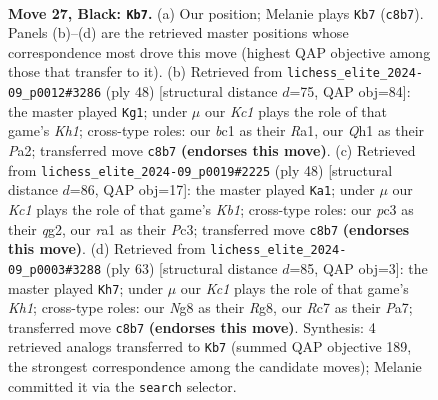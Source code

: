 \documentclass[11pt]{article}
\begin{document}
\clearpage

\begin{figure}[p]\centering
\begin{subfigure}{0.46\textwidth}\centering
\resizebox{\linewidth}{!}{%
\newchessgame
\chessboard[
  setfen={2k1Q1nr/2r3p1/8/2p3Pp/5P1P/2P5/PP3K2/RNB4q b - - 4 27},
  showmover=false,
  pgfstyle=straightmove, color=movearrow, markmove={c8-b7}
]}
\caption{}
\end{subfigure}\hfill
\begin{subfigure}{0.46\textwidth}\centering
\resizebox{\linewidth}{!}{%
\newchessgame
\chessboard[
  setfen={r3k3/p4p1p/4p2Q/2ppP3/8/2P2q2/PP3P1P/R4R1K w q - 7 25},
  showmover=false,
  pgfstyle=straightmove, color=movearrow, markmove={h1-g1}
]}
\caption{}
\end{subfigure}
\\[4pt]
\begin{subfigure}{0.46\textwidth}\centering
\resizebox{\linewidth}{!}{%
\newchessgame
\chessboard[
  setfen={r1bQ4/p4ppk/1p2p2p/4N3/5P2/2P5/PP4qP/1K2R3 w - - 2 25},
  showmover=false,
  pgfstyle=straightmove, color=movearrow, markmove={b1-a1}
]}
\caption{}
\end{subfigure}\hfill
\begin{subfigure}{0.46\textwidth}\centering
\resizebox{\linewidth}{!}{%
\newchessgame
\chessboard[
  setfen={3r2rk/pb4p1/1p2Q2p/8/2P4P/2B2P2/PP4P1/R5K1 b - - 0 32},
  showmover=false,
  pgfstyle=straightmove, color=movearrow, markmove={h8-h7}
]}
\caption{}
\end{subfigure}
\caption{\textbf{Move 27, Black: \texttt{Kb7}.} (a) Our position; Melanie plays \texttt{Kb7} (\texttt{c8b7}). Panels (b)--(d) are the retrieved master positions whose correspondence most drove this move (highest QAP objective among those that transfer to it). (b) Retrieved from \texttt{lichess\_elite\_2024-09\_p0012\#3286} (ply 48) [structural distance $d$=75, QAP obj=84]: the master played \texttt{Kg1}; under $\mu$ our \emph{Kc1} plays the role of that game's \emph{Kh1}; cross-type roles: our \emph{b}c1 as their \emph{R}a1, our \emph{Q}h1 as their \emph{P}a2; transferred move \texttt{c8b7} \textbf{(endorses this move)}. (c) Retrieved from \texttt{lichess\_elite\_2024-09\_p0019\#2225} (ply 48) [structural distance $d$=86, QAP obj=17]: the master played \texttt{Ka1}; under $\mu$ our \emph{Kc1} plays the role of that game's \emph{Kb1}; cross-type roles: our \emph{p}c3 as their \emph{q}g2, our \emph{r}a1 as their \emph{P}c3; transferred move \texttt{c8b7} \textbf{(endorses this move)}. (d) Retrieved from \texttt{lichess\_elite\_2024-09\_p0003\#3288} (ply 63) [structural distance $d$=85, QAP obj=3]: the master played \texttt{Kh7}; under $\mu$ our \emph{Kc1} plays the role of that game's \emph{Kh1}; cross-type roles: our \emph{N}g8 as their \emph{R}g8, our \emph{R}c7 as their \emph{P}a7; transferred move \texttt{c8b7} \textbf{(endorses this move)}. Synthesis: 4 retrieved analogs transferred to \texttt{Kb7} (summed QAP objective 189, the strongest correspondence among the candidate moves); Melanie committed it via the \texttt{search} selector.}
\label{fig:thought-m53}
\end{figure}
\end{document}
